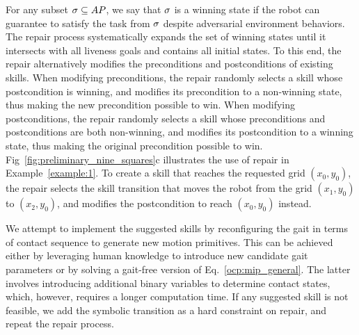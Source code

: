 \documentclass[letterpaper, 10 pt, conference]{ieeeconf}
\begin{document}

For any subset $\sigma\subseteq AP$, we say that $\sigma$ is a winning state
if the robot can guarantee to satisfy the task from $\sigma$
despite adversarial environment behaviors.
The repair process systematically expands the set of winning states until
it intersects with all liveness goals and contains all initial states.
To this end, the repair alternatively modifies the preconditions and postconditions of existing skills.
When modifying preconditions, the repair randomly selects a skill whose postcondition is winning, and modifies its precondition to a non-winning state, thus making the new precondition possible to win.
When modifying postconditions, the repair randomly selects a skill whose preconditions and postconditions are both non-winning, and modifies its postcondition to a winning state, thus making the original precondition possible to win.
%
Fig~\ref{fig:preliminary_nine_squares}c illustrates the use of repair in Example~\ref{example:1}. 
To create a skill that reaches the requested grid $(x_0, y_0)$, the
repair selects the skill transition that moves the robot from the grid $(x_1, y_0)$ to $(x_2, y_0)$,
and modifies the postcondition to reach $(x_0, y_0)$ instead.

We attempt to implement the suggested skills by reconfiguring the gait in terms of contact sequence to generate new motion primitives. This can be achieved either by leveraging human knowledge to introduce new candidate gait parameters or by solving a gait-free version of Eq.~\ref{ocp:mip_general}. The latter involves introducing additional binary variables to determine contact states, which, however, requires a longer computation time.
If any suggested skill is not feasible, 
we add the symbolic transition as a hard constraint on repair,
and repeat the repair process.
\end{document}
